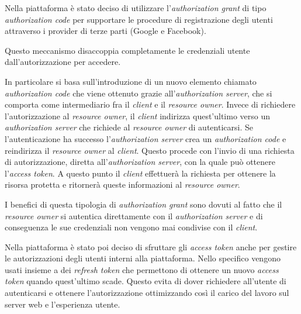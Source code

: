 Nella piattaforma è stato deciso di utilizzare l'\textit{authorization grant} di tipo \textit{authorization code} per supportare le procedure
di registrazione degli utenti attraverso i provider di terze parti (Google e Facebook).

Questo meccanismo disaccoppia completamente le credenziali utente dall'autorizzazione per accedere.

In particolare si basa sull'introduzione di un nuovo elemento chiamato \textit{authorization code}
che viene ottenuto grazie all'\textit{authorization server}, che si comporta come intermediario fra il  \textit{client} e il \textit{resource owner}.
Invece di richiedere l'autorizzazione al \textit{resource owner}, il \textit{client} indirizza quest'ultimo verso un \textit{authorization server} che richiede al \textit{resource owner} di autenticarsi.
Se l'autenticazione ha successo l'\textit{authorization server} crea un \textit{authorization code} e reindirizza il \textit{resource owner} al \textit{client}.
Questo procede con l'invio di una richiesta di autorizzazione, diretta all'\textit{authorization server}, con la quale può ottenere l'\textit{access token}.
A questo punto il \textit{client} effettuerà la richiesta per ottenere la risorsa protetta e ritornerà queste informazioni al \textit{resource owner}.

I benefici di questa tipologia di \textit{authorization grant} sono dovuti al fatto che il \textit{resource owner} si autentica direttamente con il \textit{authorization server}
e di conseguenza le sue credenziali non vengono mai condivise con il \textit{client}.

Nella piattaforma è stato poi deciso di sfruttare gli \textit{access token} anche per gestire le autorizzazioni
degli utenti interni alla piattaforma. Nello specifico vengono usati insieme a dei \textit{refresh token} che permettono
di ottenere un nuovo \textit{access token} quando quest'ultimo scade. Questo evita di dover richiedere all'utente di autenticarsi
e ottenere l'autorizzazione ottimizzando così il carico del lavoro sul server web e l'esperienza utente.
